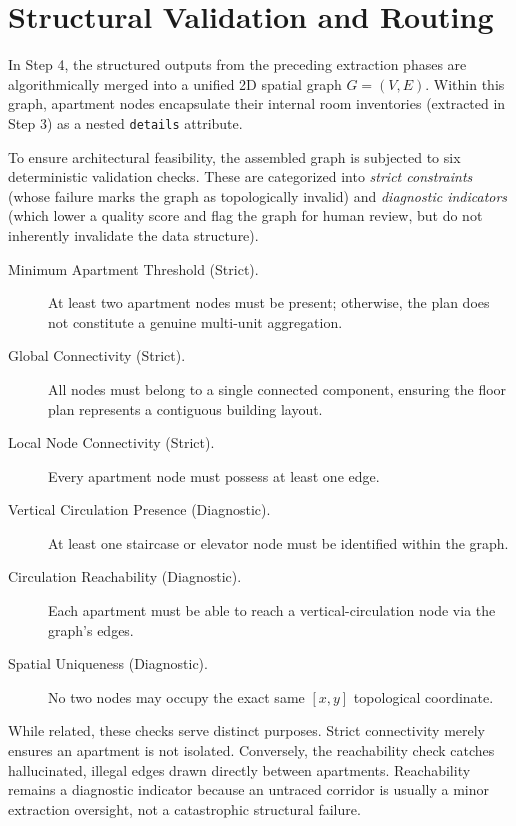 \documentclass[12pt,a4paper,openright]{report}
\begin{document}
\section{Structural Validation and Routing}
\label{sec:assembly}

In Step 4, the structured outputs from the preceding extraction phases are algorithmically merged into a unified 2D spatial graph $G = (V, E)$. Within this graph, apartment nodes encapsulate their internal room inventories (extracted in Step 3) as a nested \texttt{details} attribute. 

To ensure architectural feasibility, the assembled graph is subjected to six deterministic validation checks. These are categorized into \emph{strict constraints} (whose failure marks the graph as topologically invalid) and \emph{diagnostic indicators} (which lower a quality score and flag the graph for human review, but do not inherently invalidate the data structure).

\begin{description}
    \item[Minimum Apartment Threshold (Strict).] At least two apartment nodes must be present; otherwise, the plan does not constitute a genuine multi-unit aggregation.
    \item[Global Connectivity (Strict).] All nodes must belong to a single connected component, ensuring the floor plan represents a contiguous building layout.
    \item[Local Node Connectivity (Strict).] Every apartment node must possess at least one edge.
    \item[Vertical Circulation Presence (Diagnostic).] At least one staircase or elevator node must be identified within the graph.
    \item[Circulation Reachability (Diagnostic).] Each apartment must be able to reach a vertical-circulation node via the graph's edges.
    \item[Spatial Uniqueness (Diagnostic).] No two nodes may occupy the exact same $[x, y]$ topological coordinate.
\end{description}

While related, these checks serve distinct purposes. Strict connectivity merely ensures an apartment is not isolated. Conversely, the reachability check catches hallucinated, illegal edges drawn directly between apartments. Reachability remains a diagnostic indicator because an untraced corridor is usually a minor extraction oversight, not a catastrophic structural failure.
\end{document}
